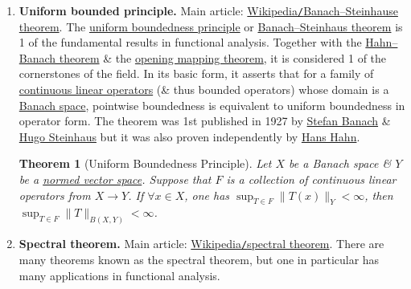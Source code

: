 \documentclass{article}
\newtheorem{theorem}{Theorem}
\begin{document}
\begin{enumerate}
	\item {\bf Uniform bounded principle.} Main article: \href{https://en.wikipedia.org/wiki/Banach-Steinhaus_theorem}{Wikipedia{\tt/}Banach--Steinhause theorem}. The \href{https://en.wikipedia.org/wiki/Uniform_boundedness_principle}{uniform boundedness principle} or \href{https://en.wikipedia.org/wiki/Banach%E2%80%93Steinhaus_theorem}{Banach--Steinhaus theorem} is 1 of the fundamental results in functional analysis. Together with the \href{https://en.wikipedia.org/wiki/Hahn%E2%80%93Banach_theorem}{Hahn--Banach theorem} \& the \href{https://en.wikipedia.org/wiki/Open_mapping_theorem_(functional_analysis)}{opening mapping theorem}, it is considered 1 of the cornerstones of the field. In its basic form, it asserts that for a family of \href{https://en.wikipedia.org/wiki/Continuous_linear_operator}{continuous linear operators} (\& thus bounded operators) whose domain is a \href{https://en.wikipedia.org/wiki/Banach_space}{Banach space}, pointwise boundedness is equivalent to uniform boundedness in operator form. The theorem was 1st published in 1927 by \href{https://en.wikipedia.org/wiki/Stefan_Banach}{\sc Stefan Banach} \& \href{https://en.wikipedia.org/wiki/Hugo_Steinhaus}{\sc Hugo Steinhaus} but it was also proven independently by \href{https://en.wikipedia.org/wiki/Hans_Hahn_(mathematician)}{\sc Hans Hahn}.
	
	\begin{theorem}[Uniform Boundedness Principle]
		Let $X$ be a Banach space \& $Y$ be a \href{https://en.wikipedia.org/wiki/Normed_vector_space}{normed vector space}. Suppose that $F$ is a collection of continuous linear operators from $X\to Y$. If $\forall x\in X$, one has $\sup_{T\in F} \|T(x)\|_Y < \infty$, then $\sup_{T\in F} \|T\|_{B(X,Y)} < \infty$.
	\end{theorem}	
	\item {\bf Spectral theorem.} Main article: \href{https://en.wikipedia.org/wiki/Spectral_theorem}{Wikipedia{\tt/}spectral theorem}. There are many theorems known as the spectral theorem, but one in particular has many applications in functional analysis.
	

\end{enumerate}
\end{document}
